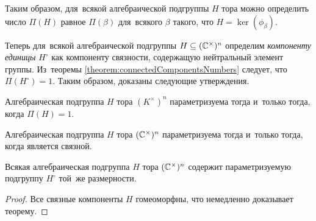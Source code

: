 Таким образом, для~всякой алгебраической подгруппы $H$ тора можно определить число $\Pi(H)$
равное $\Pi(\beta)$ для~всякого $\beta$ такого, что $H = \ker(\phi_\beta)$.

Теперь для~всякой алгебраической подгруппы $H \subseteq (\mathbb{C}^\times)^n$ определим \textit{компоненту единицы} $H^\circ$
как компоненту связности, содержащую нейтральный элемент группы. Из~теоремы \ref{theorem:connectedComponentsNumbers} следует,
что $\Pi(H^\circ) = 1$. Таким образом, доказаны следующие утверждения.

\begin{theorem}
\label{theorem:ExistenceCondition}
  Алгебраическая подгруппа $H$ тора $(K^\times)^n$ параметризуема тогда и~только тогда, когда $\Pi(H) = 1$.
\end{theorem}

\begin{consequence}
\label{consequence:ExistenceCondition}
  Алгебраическая подгруппа $H$ тора $(\mathbb{C}^\times)^n$ параметризуема тогда и~только тогда, когда является связной.
\end{consequence}

\begin{consequence}
  Всякая алгебраическая подгруппа $H$ тора $(\mathbb{C}^\times)^n$ содержит параметризуемую подгруппу $H^\circ$ той~же размерности.
\end{consequence}

\begin{proof}
  Все связные компоненты $H$ гомеоморфны, что немедленно доказывает теорему.
\end{proof}

